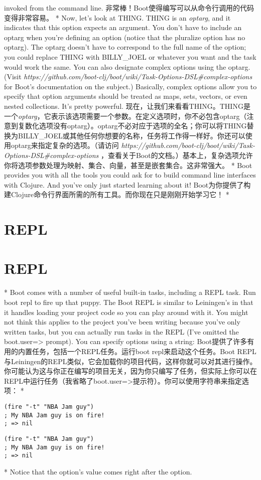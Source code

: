 \begin{paracol}{2}
invoked from the command line.
\switchcolumn
非常棒！Boot使得编写可以从命令行调用的代码变得非常容易。
\switchcolumn[0]*
Now, let's look at THING. THING is an \emph{optarg}, and it indicates
that this option expects an argument. You don't have to include an
optarg when you're defining an option (notice that the pluralize option
has no optarg). The optarg doesn't have to correspond to the full name
of the option; you could replace THING with BILLY\_JOEL or whatever you
want and the task would work the same. You can also designate complex
options using the optarg. (Visit
\emph{https://github.com/boot-clj/boot/wiki/Task-Options-DSL\#complex-options}
for Boot's documentation on the subject.) Basically, complex options
allow you to specify that option arguments should be treated as maps,
sets, vectors, or even nested collections. It's pretty powerful.
\switchcolumn
现在，让我们来看看THING。THING是一个\emph{optarg}，它表示该选项需要一个参数。在定义选项时，你不必包含optarg（注意到复数化选项没有optarg）。optarg不必对应于选项的全名；你可以将THING替换为BILLY\_JOEL或其他任何你想要的名称，任务将工作得一样好。你还可以使用optarg来指定复杂的选项。（请访问
\emph{https://github.com/boot-clj/boot/wiki/Task-Options-DSL\#complex-options}
，查看关于Boot的文档。）基本上，复杂选项允许你将选项参数处理为映射、集合、向量，甚至是嵌套集合。这非常强大。
\switchcolumn[0]*
Boot provides you with all the tools you could ask for to build command
line interfaces with Clojure. And you've only just started learning
about it!
\switchcolumn
Boot为你提供了构建Clojure命令行界面所需的所有工具。而你现在只是刚刚开始学习它！
\switchcolumn[0]*
\section{REPL}
\switchcolumn
\section{REPL}
\switchcolumn[0]*
Boot comes with a number of useful built-in tasks, including a REPL
task. Run boot repl to fire up that puppy. The Boot REPL is similar to
Leiningen's in that it handles loading your project code so you can play
around with it. You might not think this applies to the project you've
been writing because you've only written tasks, but you can actually run
tasks in the REPL (I've omitted the boot.user=\textgreater{} prompt).
You can specify options using a string:
\switchcolumn
Boot提供了许多有用的内置任务，包括一个REPL任务。运行boot repl来启动这个任务。Boot REPL与Leiningen的REPL类似，它会加载你的项目代码，这样你就可以对其进行操作。你可能认为这与你正在编写的项目无关，因为你只编写了任务，但实际上你可以在REPL中运行任务（我省略了boot.user=\textgreater{}提示符）。你可以使用字符串来指定选项：
\switchcolumn[0]*
\begin{verbatim}
(fire "-t" "NBA Jam guy")
; My NBA Jam guy is on fire!
; => nil
\end{verbatim}
\switchcolumn
\begin{verbatim}
(fire "-t" "NBA Jam guy")
; My NBA Jam guy is on fire!
; => nil
\end{verbatim}
\switchcolumn[0]*
Notice that the option's value comes right after the option.


\end{paracol}
